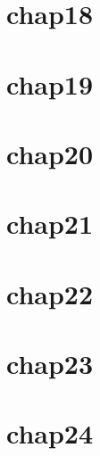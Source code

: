 \documentclass[en,11pt,english,black,simple,device=ppt]{elegantbook}
\begin{document}


\section{chap18}



\section{chap19}



\section{chap20}



\section{chap21}



\section{chap22}



\section{chap23}



\section{chap24}


\end{document}
